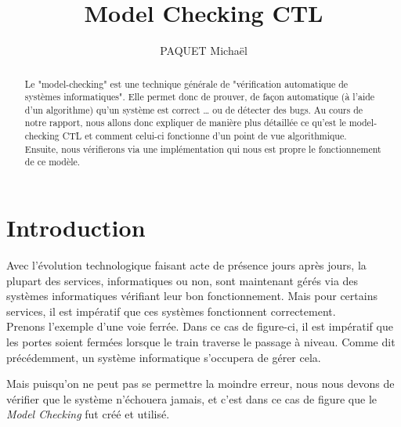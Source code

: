 \documentclass[runningheads,a4paper]{llncs}
\begin{document}
\mainmatter 

\title{Model Checking CTL}


\author{PAQUET Michaël}



\tocauthor{{}}

\maketitle

\begin{abstract}
Le "model-checking" est une technique générale de "vérification automatique de systèmes informatiques". Elle permet donc de prouver, de façon automatique (à l'aide d'un algorithme) qu'un système est correct … ou de détecter des bugs. Au cours de notre rapport, nous allons donc expliquer de manière plus détaillée ce qu'est le model-checking CTL et comment celui-ci fonctionne d'un point de vue algorithmique. Ensuite, nous vérifierons via une implémentation qui nous est propre le fonctionnement de ce modèle. 
\end{abstract}

\medskip

\begingroup
\let\clearpage\relax
\tableofcontents
{}
\endgroup

\medskip
\medskip

\newpage 

\section*{Introduction}

Avec l'évolution technologique faisant acte de présence jours après jours, la plupart des services, informatiques ou non, sont maintenant gérés via des systèmes informatiques vérifiant leur bon fonctionnement. Mais pour certains services, il est impératif que ces systèmes fonctionnent correctement.\\


\noindent Prenons l'exemple d'une voie ferrée. Dans ce cas de figure-ci, il est impératif que les portes soient fermées lorsque le train traverse le passage à niveau. Comme dit précédemment, un système informatique s'occupera de gérer cela.

\noindent Mais puisqu'on ne peut pas se permettre la moindre erreur, nous nous devons de vérifier que le système n'échouera jamais, et c'est dans ce cas de figure que le \textit{Model Checking} fut créé et utilisé.\\
\end{document}
